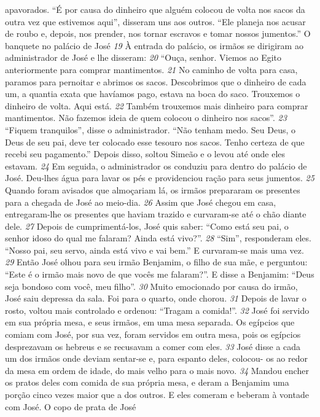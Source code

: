 apavorados. “É por causa do dinheiro que alguém colocou de volta nos sacos da
outra vez que estivemos aqui”, disseram uns aos outros. “Ele planeja nos acusar de
roubo e, depois, nos prender, nos tornar escravos e tomar nossos jumentos.”
O banquete no palácio de José
\textit{\tiny 19}
À entrada do palácio, os irmãos se dirigiram ao administrador de José e lhe
disseram: 
\textit{\tiny 20}
“Ouça, senhor. Viemos ao Egito anteriormente para comprar
mantimentos. 
\textit{\tiny 21}
No caminho de volta para casa, paramos para pernoitar e
abrimos os sacos. Descobrimos que o dinheiro de cada um, a quantia exata que
havíamos pago, estava na boca do saco. Trouxemos o dinheiro de volta. Aqui está.
\textit{\tiny 22}
Também trouxemos mais dinheiro para comprar mantimentos. Não fazemos
ideia de quem colocou o dinheiro nos sacos”.
\textit{\tiny 23}
“Fiquem tranquilos”, disse o administrador. “Não tenham medo. Seu Deus, o
Deus de seu pai, deve ter colocado esse tesouro nos sacos. Tenho certeza de que
recebi seu pagamento.” Depois disso, soltou Simeão e o levou até onde eles
estavam.
\textit{\tiny 24}
Em seguida, o administrador os conduziu para dentro do palácio de José.
Deu-lhes água para lavar os pés e providenciou ração para seus jumentos.
\textit{\tiny 25}
Quando foram avisados que almoçariam lá, os irmãos prepararam os presentes
para a chegada de José ao meio-dia.
\textit{\tiny 26}
Assim que José chegou em casa, entregaram-lhe os presentes que haviam
trazido e curvaram-se até o chão diante dele. 
\textit{\tiny 27}
Depois de cumprimentá-los, José
quis saber: “Como está seu pai, o senhor idoso do qual me falaram? Ainda está
vivo?”.
\textit{\tiny 28}
“Sim”, responderam eles. “Nosso pai, seu servo, ainda está vivo e vai bem.” E
curvaram-se mais uma vez.
\textit{\tiny 29}
Então José olhou para seu irmão Benjamim, o filho de sua mãe, e perguntou:
“Este é o irmão mais novo de que vocês me falaram?”. E disse a Benjamim: “Deus
seja bondoso com você, meu filho”. 
\textit{\tiny 30}
Muito emocionado por causa do irmão, José
saiu depressa da sala. Foi para o quarto, onde chorou. 
\textit{\tiny 31}
Depois de lavar o rosto,
voltou mais controlado e ordenou: “Tragam a comida!”.
\textit{\tiny 32}
José foi servido em sua própria mesa, e seus irmãos, em uma mesa separada.
Os egípcios que comiam com José, por sua vez, foram servidos em outra mesa,
pois os egípcios desprezavam os hebreus e se recusavam a comer com eles. 
\textit{\tiny 33}
José
disse a cada um dos irmãos onde deviam sentar-se e, para espanto deles, colocou-
os ao redor da mesa em ordem de idade, do mais velho para o mais novo.
\textit{\tiny 34}
Mandou encher os pratos deles com comida de sua própria mesa, e deram a
Benjamim uma porção cinco vezes maior que a dos outros. E eles comeram e
beberam à vontade com José.
O copo de prata de José

